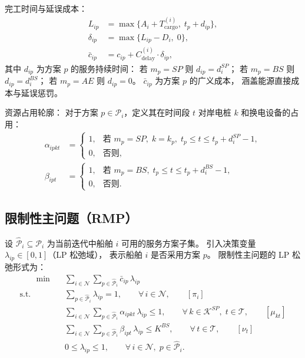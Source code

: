 \documentclass[UTF8, a4paper, 12pt]{ctexart}
\theoremstyle{plain}
\theoremstyle{definition}
\theoremstyle{remark}
\begin{document}
\noindent 完工时间与延误成本：
\begin{align}
  L_{ip} &= \max\!\Big\{A_i + T_{\text{cargo}}^{(i)},\;
    t_p + d_{ip}\Big\},
  \label{eq:col_finish} \\
  \delta_{ip} &= \max\!\big\{L_{ip} - D_i,\; 0\big\},
  \label{eq:col_delay} \\
  \bar{c}_{ip} &= c_{ip} + C_{\text{delay}}^{(i)} \cdot \delta_{ip},
  \label{eq:col_gencost}
\end{align}
其中 $d_{ip}$ 为方案 $p$ 的服务持续时间：
若 $m_p = SP$ 则 $d_{ip} = d_i^{SP}$；
若 $m_p = BS$ 则 $d_{ip} = d_i^{BS}$；
若 $m_p = AE$ 则 $d_{ip} = 0$。
$\bar{c}_{ip}$ 为方案 $p$ 的广义成本，
涵盖能源直接成本与延误惩罚。

\medskip
\noindent 资源占用轮廓：
对于方案 $p \in \mathcal{P}_i$，定义其在时间段 $t$ 对岸电桩 $k$ 和换电设备的占用：
\begin{align}
  \alpha_{ipkt} &=
  \begin{cases}
    1, & \text{若 } m_p = SP,\; k = k_p,\;
         t_p \le t \le t_p + d_i^{SP} - 1, \\
    0, & \text{否则},
  \end{cases}
  \label{eq:col_alpha} \\
  \beta_{ipt} &=
  \begin{cases}
    1, & \text{若 } m_p = BS,\;
         t_p \le t \le t_p + d_i^{BS} - 1, \\
    0, & \text{否则}.
  \end{cases}
  \label{eq:col_beta}
\end{align}

\subsection{限制性主问题（RMP）}
\label{sec:cg_rmp}

设 $\hat{\mathcal{P}}_i \subseteq \mathcal{P}_i$ 为当前迭代中船舶 $i$
可用的服务方案子集。
引入决策变量 $\lambda_{ip} \in [0,1]$（LP 松弛域），
表示船舶 $i$ 是否采用方案 $p$。
限制性主问题的 LP 松弛形式为：
\begin{align}
  [\text{RMP}] \qquad
  \min \quad & \sum_{i \in \mathcal{N}} \sum_{p \in \hat{\mathcal{P}}_i}
    \bar{c}_{ip}\, \lambda_{ip}
  \label{eq:rmp_obj} \\
  \text{s.t.} \quad
  & \sum_{p \in \hat{\mathcal{P}}_i} \lambda_{ip} = 1,
    \qquad \forall\, i \in \mathcal{N},
    \qquad [\pi_i]
  \label{eq:rmp_convex} \\
  & \sum_{i \in \mathcal{N}} \sum_{p \in \hat{\mathcal{P}}_i}
    \alpha_{ipkt}\, \lambda_{ip} \le 1,
    \qquad \forall\, k \in \mathcal{K}^{SP},\; t \in \mathcal{T},
    \qquad [\mu_{kt}]
  \label{eq:rmp_sp} \\
  & \sum_{i \in \mathcal{N}} \sum_{p \in \hat{\mathcal{P}}_i}
    \beta_{ipt}\, \lambda_{ip} \le K^{BS},
    \qquad \forall\, t \in \mathcal{T},
    \qquad [\nu_t]
  \label{eq:rmp_bs} \\
  & 0 \le \lambda_{ip} \le 1,
    \qquad \forall\, i \in \mathcal{N},\; p \in \hat{\mathcal{P}}_i.
  \label{eq:rmp_bound}
\end{align}
\end{document}
